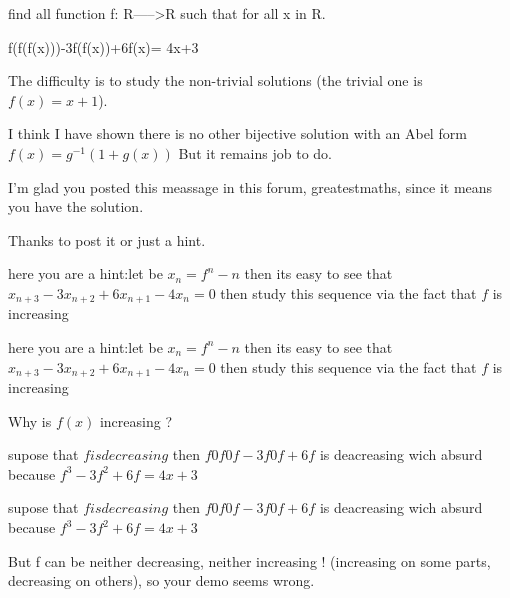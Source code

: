 \begin{mysolution}
	\begin{tcolorbox}find all function f: R----->R such that for all x in R. 

f(f(f(x)))-3f(f(x))+6f(x)= 4x+3\end{tcolorbox}

The difficulty is to study the non-trivial solutions (the trivial one is $ f(x)=x+1$).

I think I have shown there is no other bijective solution with an Abel form $ f(x)=g^{-1}(1+g(x))$
But it remains job to do.

I'm glad you posted this meassage in this forum, greatestmaths, since it means you have the solution.

Thanks to post it
or just a hint.
\end{mysolution}



\begin{mysolution}
	here you are a hint:let be $ x_{n}=f^{n}-n$ then its easy to see that $ x_{n+3}-3x_{n+2}+6x_{n+1}-4x_{n}=0$ then study this sequence via the fact that $ f$ is increasing
 
\end{mysolution}



\begin{mysolution}
	\begin{tcolorbox}here you are a hint:let be $ x_{n}= f^{n}-n$ then its easy to see that $ x_{n+3}-3x_{n+2}+6x_{n+1}-4x_{n}= 0$ then study this sequence via the fact that $ f$ is increasing
 \end{tcolorbox}

Why is $ f(x)$ increasing ?
\end{mysolution}



\begin{mysolution}
	supose that $ f is decreasing$ then $ f0f0f-3f0f+6f$ is deacreasing wich absurd because $ f^{3}-3f^{2}+6f=4x+3$ 
\end{mysolution}



\begin{mysolution}
	\begin{tcolorbox}supose that $ f is decreasing$ then $ f0f0f-3f0f+6f$ is deacreasing wich absurd because $ f^{3}-3f^{2}+6f = 4x+3$ \end{tcolorbox}

But f can be neither decreasing, neither increasing ! (increasing on some parts, decreasing on others), so your demo seems wrong.
\end{mysolution}




